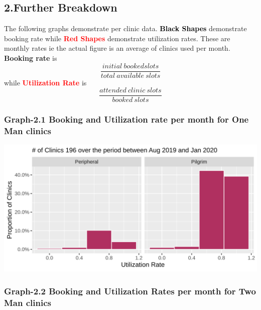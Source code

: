 \documentclass[]{article}
\begin{document}
\hypertarget{further-breakdown}{%
\subsection{2.Further Breakdown}\label{further-breakdown}}

The following graphs demonstrate per clinic data.
\textcolor{black}{\textbf{Black Shapes}} demonstrate booking rate while
\textcolor{red}{\textbf{Red Shapes}} demonstrate utilization rates.
These are monthly rates ie the actual figure is an average of clinics
used per month. \textbf{Booking rate} is
\[\frac{initial\ booked slots}{total\ available\ slots}\] while
\textcolor{red}{\textbf{Utilization Rate}} is
\[\frac{attended \ clinic\  slots}{booked\ slots}\]

\hypertarget{graph-2.1-booking-and-utilization-rate-per-month-for-one-man-clinics}{%
\subsubsection{Graph-2.1 Booking and Utilization rate per month for One
Man
clinics}\label{graph-2.1-booking-and-utilization-rate-per-month-for-one-man-clinics}}

\begin{center}\includegraphics{LF2_files/figure-latex/unnamed-chunk-5-1} \end{center}

\hypertarget{graph-2.2-booking-and-utilization-rates-per-month-for-two-man-clinics}{%
\subsubsection{Graph-2.2 Booking and Utilization Rates per month for Two
Man
clinics}\label{graph-2.2-booking-and-utilization-rates-per-month-for-two-man-clinics}}
\end{document}
